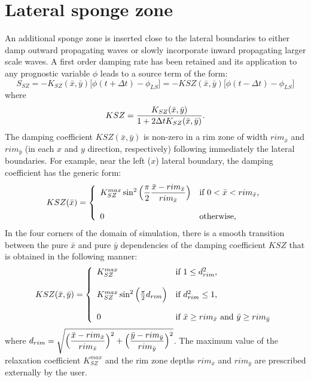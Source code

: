 \section{Lateral sponge zone}
An additional sponge zone is inserted close to the lateral boundaries to either
damp outward propagating waves or slowly incorporate inward propagating
larger scale waves. A first order damping rate has been retained and its
application to any prognostic variable $\phi$ leads to a source term of the
form:
$$
S_{SZ}=-K_{SZ} (\bar x, \bar y)\big[\phi(t+\Delta t)- \phi_{LS} \big]
      =-KSZ(\bar x, \bar y) \big[\phi(t-\Delta t)- \phi_{LS} \big]$$
where
$$ KSZ= {K_{SZ}(\bar x, \bar y) \over 1+2 \Delta t K_{SZ}(\bar x, \bar y)}.$$
The damping coefficient $KSZ(\bar x, \bar y)$ is non-zero in a rim zone of
width ${rim}_{\bar x}$ and ${rim}_{\bar y}$ (in each $x$ and $y$ direction,
respectively) following immediately the lateral boundaries. For example, near
the left ($x$) lateral boundary, the damping coefficient has the generic form:
$$
KSZ(\bar x) = \left\{ \begin{array}{ll}
K_{SZ}^{max} \sin^2 \Big(\displaystyle{{\pi \over 2}{\bar x-{rim}_{\bar x} \over {rim}_{\bar x}}} \Big)
            & \mbox{if $0 < \bar x < {rim}_{\bar x}$,} \\
 \\
 0          & \mbox{otherwise,}
                   \end{array}
        \right.
$$
In the four corners of the domain of simulation, there is a smooth transition
between the pure $\bar x$ and pure $\bar y$ dependencies of the damping
coefficient $KSZ$ that is obtained in the following manner:
$$
KSZ(\bar x, \bar y) = \left\{ \begin{array}{ll}
K_{SZ}^{max}& \mbox{if $1 \le d_{rim}^2$,} \\
 \\
K_{SZ}^{max} \sin^2 \Big({\pi \over 2} d_{rim} \Big)
            & \mbox{if $d_{rim}^2 \le 1$,} \\
 \\
 0          & \mbox{if $\bar x \ge {rim}_{\bar x}$ and $\bar y \ge {rim}_{\bar y}$} \\
                         \end{array}
        \right.
$$
where
$d_{rim}= \sqrt{\Big( \displaystyle{{\bar x-{rim}_{\bar x} \over {rim}_{\bar x}}\Big)^2 +
                \Big( {\bar y-{rim}_{\bar y} \over {rim}_{\bar y}}\Big)^2 }}$.
The maximum value of the relaxation coefficient $K_{SZ}^{max}$ and the rim zone
depths ${rim}_{\bar x}$ and ${rim}_{\bar y}$ are prescribed externally by the
user.


